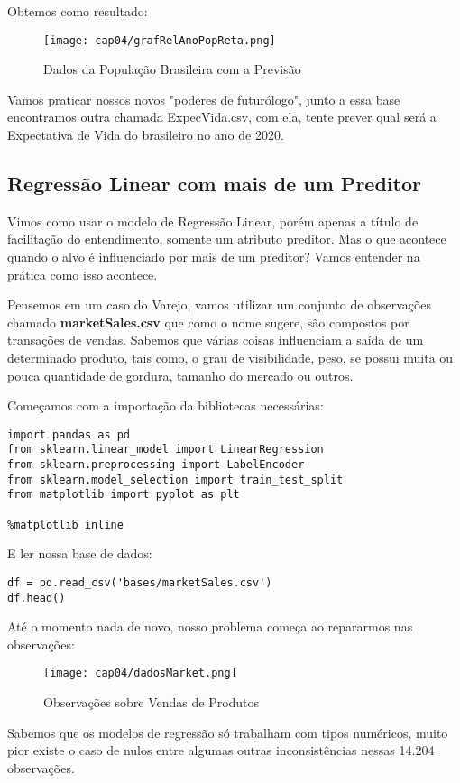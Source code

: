 Obtemos como resultado:
\begin{figure}[H]
	\centering
	\texttt{[image: cap04/grafRelAnoPopReta.png]}
	\caption{Dados da População Brasileira com a Previsão}
\end{figure}

Vamos praticar nossos novos "poderes de futurólogo", junto a essa base encontramos outra chamada ExpecVida.csv, com ela, tente prever qual será a Expectativa de Vida do brasileiro no ano de 2020.

\subsection{Regressão Linear com mais de um Preditor}
Vimos como usar o modelo de Regressão Linear, porém apenas a título de facilitação do entendimento, somente um atributo preditor. Mas o que acontece quando o alvo é influenciado por mais de um preditor? Vamos entender na prática como isso acontece.

Pensemos em um caso do Varejo, vamos utilizar um conjunto de observações chamado \textbf{marketSales.csv} que como o nome sugere, são compostos por transações de vendas. Sabemos que várias coisas influenciam a saída de um determinado produto, tais como, o grau de visibilidade, peso, se possui muita ou pouca quantidade de gordura, tamanho do mercado ou outros.

Começamos com a importação da bibliotecas necessárias:
\begin{lstlisting}[]
import pandas as pd
from sklearn.linear_model import LinearRegression
from sklearn.preprocessing import LabelEncoder
from sklearn.model_selection import train_test_split
from matplotlib import pyplot as plt

%matplotlib inline
\end{lstlisting}

E ler nossa base de dados:
\begin{lstlisting}[]
df = pd.read_csv('bases/marketSales.csv')
df.head()
\end{lstlisting}

Até o momento nada de novo, nosso problema começa ao repararmos nas observações:
\begin{figure}[H]
	\centering
	\texttt{[image: cap04/dadosMarket.png]}
	\caption{Observações sobre Vendas de Produtos}
\end{figure}

Sabemos que os modelos de regressão só trabalham com tipos numéricos, muito pior existe o caso de nulos entre algumas outras inconsistências  nessas 14.204 observações.

